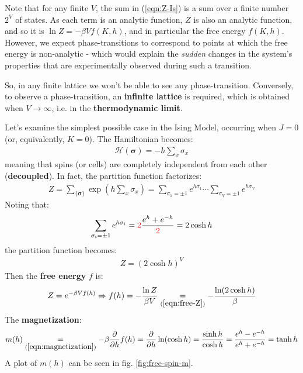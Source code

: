 \documentclass[../../main.tex]{subfiles}
\begin{document}
Note that for any finite $V$, the sum in (\ref{eqn:Z-Is}) is a sum over a finite number $2^V$ of states. As each term is an analytic function, $Z$ is also an analytic function, and so it is $\ln Z = - \beta V f(K,h)$, and in particular the free energy $f(K,h)$. However, we expect phase-transitions to correspond to points at which the free energy is non-analytic - which would explain the \textit{sudden} changes in the system's properties that are experimentally observed during such a transition. %

So, in any finite lattice we won't be able to see any phase-transition. Conversely, to observe a phase-transition, an \textbf{infinite lattice} is required, which is obtained when $V \to \infty$, i.e. in the \textbf{thermodynamic limit}. 

\begin{example}
    Let's examine the simplest possible case in the Ising Model, occurring when $J=0$ (or, equivalently, $K=0$). The Hamiltonian becomes:
    \begin{align}\label{eqn:free-H}
        \mathcal{H}(\bm{\sigma}) = -h \sum_x \sigma_x
    \end{align}
    meaning that spins (or cells) are completely independent from each other (\textbf{decoupled}). In fact, the partition function factorizes:
    \begin{align*}
        Z= \sum_{\{\bm{\sigma}\}} \exp({h \sum_x \sigma_x}) = \sum_{\sigma_1 = \pm 1} e^{h \sigma_1} \cdots \sum_{\sigma_V = \pm 1}e^{h \sigma_V}
    \end{align*}
    Noting that:
    \begin{align*}
        \sum_{\sigma_i = \pm 1} e^{h \sigma_i} = \textcolor{Red}{2} \frac{e^{h} + e^{-h}}{\textcolor{Red}{2}} = 2 \cosh h
    \end{align*}
    the partition function becomes:
    \begin{align} \label{eqn:free-Z}
        Z = (2 \cosh h)^V
    \end{align}
    Then the \textbf{free energy} $f$ is:
    \begin{align}\label{eqn:free-f}
        Z = e^{- \beta V f(h)} \Rightarrow f(h) = - \frac{\ln Z}{\beta V} \underset{(\ref{eqn:free-Z})}{=}  -\frac{\ln(2 \cosh h)}{\beta}
    \end{align}
    The \textbf{magnetization}:
    \begin{align}\label{eqn:mh}
        m(h) \underset{(\ref{eqn:magnetization})}{=}  -\beta \pdv{h}f(h) = \pdv{h} \ln(\cosh h) = \frac{\sinh h}{\cosh h} = \frac{e^h - e^{-h}}{e^{h} + e^{-h}} = \tanh h  
    \end{align}
    A plot of $m(h)$ can be seen in fig. \ref{fig:free-spin-m}. 


\end{example}
\end{document}
